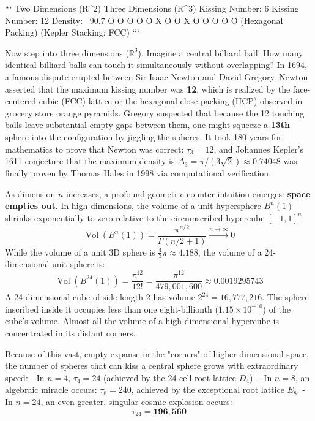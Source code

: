 \documentclass[11pt,twoside,openright]{amsbook}
\begin{document}
```
       Two Dimensions (R^2)                         Three Dimensions (R^3)
          Kissing Number: 6                           Kissing Number: 12
           Density: ~90.7%
                 O   O                                      O   O
               O   X   O                                  O   X   O
                 O   O                                      O   O
          (Hexagonal Packing)                         (Kepler Stacking: FCC)
```

Now step into three dimensions ($\mathbb{R}^3$). Imagine a central billiard ball. How many identical billiard balls can touch it simultaneously without overlapping? In 1694, a famous dispute erupted between Sir Isaac Newton and David Gregory. Newton asserted that the maximum kissing number was \textbf{12}, which is realized by the face-centered cubic (FCC) lattice or the hexagonal close packing (HCP) observed in grocery store orange pyramids. Gregory suspected that because the 12 touching balls leave substantial empty gaps between them, one might squeeze a \textbf{13th} sphere into the configuration by jiggling the spheres. It took 180 years for mathematics to prove that Newton was correct: $\tau_3 = 12$, and Johannes Kepler's 1611 conjecture that the maximum density is $\Delta_3 = \pi / (3\sqrt{2}) \approx 0.74048$ was finally proven by Thomas Hales in 1998 via computational verification.

As dimension $n$ increases, a profound geometric counter-intuition emerges: \textbf{space empties out}. 
In high dimensions, the volume of a unit hypersphere $B^n(1)$ shrinks exponentially to zero relative to the circumscribed hypercube $[-1, 1]^n$:
$$\operatorname{Vol}(B^n(1)) = \frac{\pi^{n/2}}{\Gamma(n/2 + 1)} \xrightarrow{n \to \infty} 0$$
While the volume of a unit 3D sphere is $\frac{4}{3}\pi \approx 4.188$, the volume of a 24-dimensional unit sphere is:
$$\operatorname{Vol}(B^{24}(1)) = \frac{\pi^{12}}{12!} = \frac{\pi^{12}}{479,001,600} \approx 0.0019295743$$
A 24-dimensional cube of side length 2 has volume $2^{24} = 16,777,216$. The sphere inscribed inside it occupies less than one eight-billionth ($1.15 \times 10^{-10}$) of the cube's volume. Almost all the volume of a high-dimensional hypercube is concentrated in its distant corners.

Because of this vast, empty expanse in the "corners" of higher-dimensional space, the number of spheres that can kiss a central sphere grows with extraordinary speed:
- In $n = 4$, $\tau_4 = 24$ (achieved by the 24-cell root lattice $D_4$).
- In $n = 8$, an algebraic miracle occurs: $\tau_8 = 240$, achieved by the exceptional root lattice $E_8$.
- In $n = 24$, an even greater, singular cosmic explosion occurs:
$$\tau_{24} = \mathbf{196,560}$$
\end{document}
